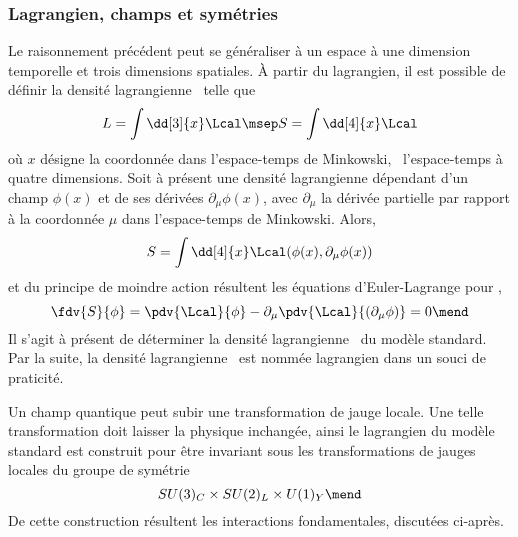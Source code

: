 \subsubsection{Lagrangien, champs et symétries}\label{chapter-MS-MSSM-section-formalisme-subsec-into_lagrangien-subsubsec-lagrangien_champs_symetries}
Le raisonnement précédent peut se généraliser à un espace à une dimension temporelle et trois dimensions spatiales.
À partir du lagrangien, il est possible de définir la densité lagrangienne \Lcal\ telle que
\begin{equation}
L = \int\dd[3]{x}\Lcal
\msep
S = \int\dd[4]{x}\Lcal
\end{equation}
où $x$ désigne la coordonnée dans l'espace-temps de Minkowski, \ie\ l'espace-temps à quatre dimensions.
Soit à présent une densité lagrangienne dépendant d'un champ $\phi(x)$ et de ses dérivées $\partial_\mu\phi(x)$,
avec $\partial_\mu$ la dérivée partielle par rapport à la coordonnée $\mu$ dans l'espace-temps de Minkowski.
Alors,
\begin{equation}
S = \int\dd[4]{x}\Lcal(\phi(x),\partial_\mu\phi(x))
\end{equation}
et du principe de moindre action résultent les équations d'Euler-Lagrange pour \Lcal,
\begin{equation}
\fdv{S}{\phi}
=
\pdv{\Lcal}{\phi} - \partial_\mu\pdv{\Lcal}{(\partial_\mu\phi)} = 0
\mend
\end{equation}
Il s'agit à présent de déterminer la densité lagrangienne \Lcal\ du modèle standard.
Par la suite, la densité lagrangienne \Lcal\ est nommée \og lagrangien \fg{} dans un souci de praticité.
\par Un champ quantique peut subir une transformation de jauge locale. Une telle transformation doit laisser la physique inchangée, ainsi le lagrangien du modèle standard est construit pour être invariant sous les transformations de jauges locales du groupe de symétrie
\begin{equation}
SU(3)_C \times SU(2)_L \times U(1)_Y
\mend
\label{eq-symmetries_lagrangien_SM}
\end{equation}
De cette construction résultent les interactions fondamentales, discutées ci-après.






